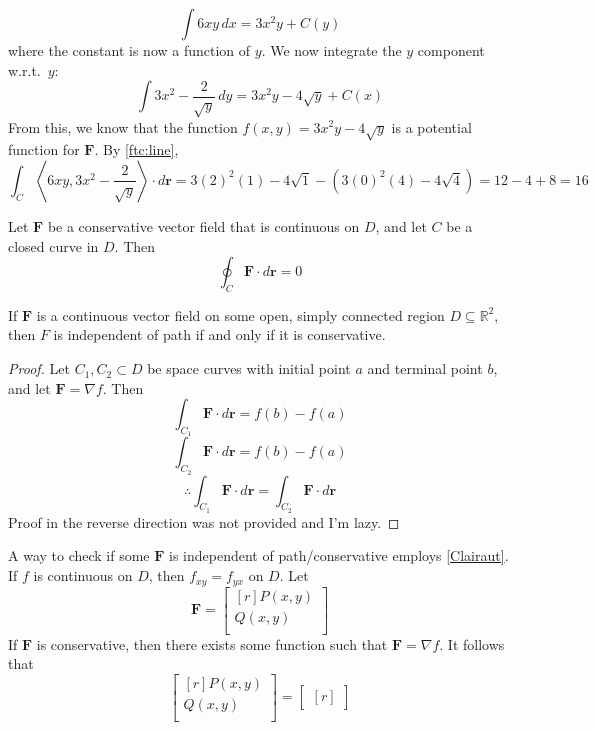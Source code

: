 \begin{intuition}
\begin{eg}
    \[
        \int6xy\,dx = 3x^2 y + C(y)
    \]
    where the constant is now a function of \(y\). We now integrate the \(y\) component w.r.t.\  \(y\):
    \[
        \int 3x^2 - \frac{2}{\sqrt{y} }\,dy = 3x^2 y - 4\sqrt{y} + C(x)
    \]
    From this, we know that the function \(f(x,y)=3x^2 y-4\sqrt{y} \) is a potential function for \(\mathbf{F}\). By \ref{ftc:line},
    \[
        \int_C \left\langle 6xy,3x^2 -\frac{2}{\sqrt{y} } \right\rangle \cdot d \mathbf{r}= 3(2)^2 (1)-4\sqrt{1} - \left( 3(0)^2 (4) - 4\sqrt{4}  \right)  = 12-4+8=16
    \]
\end{eg}
\begin{corollary}
    Let \(\mathbf{F}\) be a conservative vector field that is continuous on \(D\), and let \(C\) be a closed curve in \(D\). Then 
    \[
        \oint_C \mathbf{F}\cdot d \mathbf{r}=0
    \]
\end{corollary}
\begin{theorem}
    If \(\mathbf{F}\) is a continuous vector field on some open, simply connected region \(D\subseteq \mathbb{R}^2\), then \(F\) is independent of path if and only if it is conservative.
\end{theorem}
\begin{proof}
    Let \(C_1,C_2 \subset D\) be space curves with initial point \(a\) and terminal point \(b\), and let \(\mathbf{F}=\nabla f\). Then 
    \[
        \int_{C_1}\mathbf{F}\cdot d \mathbf{r}=f(b)-f(a)
    \]
    \[
        \int_{C_2}\mathbf{F}\cdot d \mathbf{r}=f(b)-f(a)
    \]
    \[
        \therefore \int_{C_1}\mathbf{F}\cdot d \mathbf{r}=\int_{C_2}\mathbf{F}\cdot d \mathbf{r}
    \]
    Proof in the reverse direction was not provided and I'm lazy.
\end{proof}
A way to check if some \(\mathbf{F}\) is independent of path/conservative employs \ref{Clairaut}. If \(f\) is continuous on \(D\), then \(f_{xy}=f_{yx}  \) on \(D\). Let 
\[
    \mathbf{F}=\begin{bmatrix}[r]
         P(x,y) \\
          Q(x,y)\\
    \end{bmatrix}
\]
If \(\mathbf{F}\) is conservative, then there exists some function such that \(\mathbf{F}= \nabla f\). It follows that 
\[
    \begin{bmatrix}[r]
         P(x,y) \\
          Q(x,y)\\
    \end{bmatrix} = \begin{bmatrix}[r]

\end{bmatrix}\]
\end{intuition}
